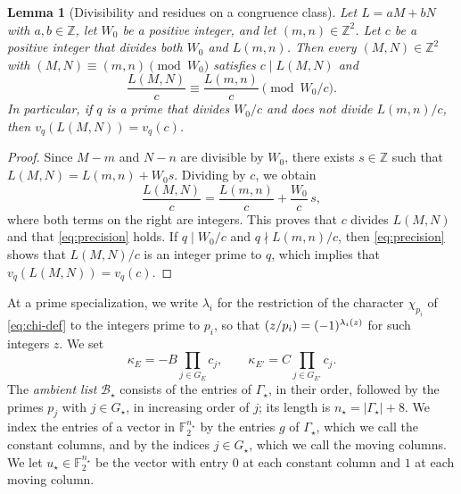 \documentclass[12pt,oneside,openany]{book}
\theoremstyle{definition}
\theoremstyle{plain}
\numberwithin{equation}{chapter}
\theoremstyle{plain}
\newtheorem{lemma}[lemma]{Lemma}
\theoremstyle{definition}
\theoremstyle{remark}
\newcommand{\Z}{\mathbb Z}
\newcommand{\F}{\mathbb F}
\newcommand{\leg}[2]{\mathchoice{\left(\frac{#1}{#2}\right)}{(#1/#2)}{(#1/#2)}{(#1/#2)}}
\newcommand{\cB}{\mathcal B}
\begin{document}
\begin{lemma}[Divisibility and residues on a congruence class]\label{lem:precision}
Let $L=aM+bN$ with $a,b\in\Z$, let $W_0$ be a positive integer, and let $(m,n)\in\Z^2$. Let $c$ be a positive integer that divides both $W_0$ and $L(m,n)$. Then every $(M,N)\in\Z^2$ with $(M,N)\equiv(m,n)\pmod{W_0}$ satisfies $c\mid L(M,N)$ and
\begin{equation}\label{eq:precision}
\frac{L(M,N)}c\equiv\frac{L(m,n)}c\pmod{W_0/c}.
\end{equation}
In particular, if $q$ is a prime that divides $W_0/c$ and does not divide $L(m,n)/c$, then $v_q(L(M,N))=v_q(c)$.
\end{lemma}

\begin{proof}
Since $M-m$ and $N-n$ are divisible by $W_0$, there exists $s\in\Z$ such that $L(M,N)=L(m,n)+W_0s$. Dividing by $c$, we obtain
\begin{equation}
\frac{L(M,N)}c=\frac{L(m,n)}c+\frac{W_0}c\,s,
\end{equation}
where both terms on the right are integers. This proves that $c$ divides $L(M,N)$ and that \eqref{eq:precision} holds. If $q\mid W_0/c$ and $q\nmid L(m,n)/c$, then \eqref{eq:precision} shows that $L(M,N)/c$ is an integer prime to $q$, which implies that $v_q(L(M,N))=v_q(c)$.
\end{proof}

At a prime specialization, we write $\lambda_i$ for the restriction of the character $\chi_{p_i}$ of \eqref{eq:chi-def} to the integers prime to $p_i$, so that $\leg z{p_i}=(-1)^{\lambda_i(z)}$ for such integers $z$. We set
\begin{equation}\label{eq:kappa}
\kappa_E=-B\prod_{j\in G_E}c_j,\qquad\kappa_{E'}=C\prod_{j\in G_{E'}}c_j.
\end{equation}
The \emph{ambient list} $\cB_\star$ consists of the entries of $\Gamma_\star$, in their order, followed by the primes $p_j$ with $j\in G_\star$, in increasing order of $j$; its length is $n_\star=|\Gamma_\star|+8$. We index the entries of a vector in $\F_2^{n_\star}$ by the entries $g$ of $\Gamma_\star$, which we call the constant columns, and by the indices $j\in G_\star$, which we call the moving columns. We let $u_\star\in\F_2^{n_\star}$ be the vector with entry $0$ at each constant column and $1$ at each moving column.
\end{document}
